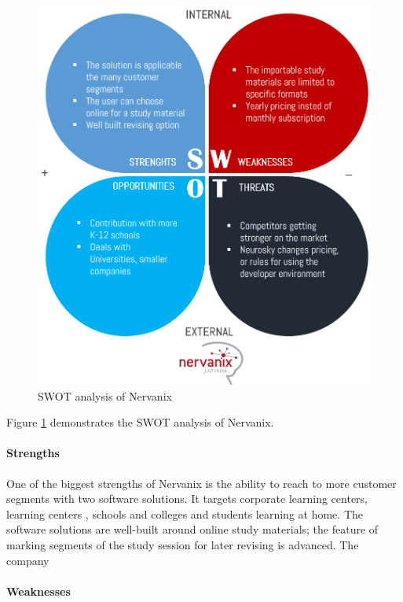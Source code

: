 \documentclass[letterpaper,10pt]{article}
\begin{document}
\begin{figure}[!htb]
\centering
\includegraphics[scale=0.4]{nervanix_swot.PNG}
\caption{SWOT analysis of Nervanix}
\label{img:nervanix_swot}
\end{figure}

Figure \ref{img:nervanix_swot} demonstrates the SWOT analysis of Nervanix.


\paragraph{Strengths}

One of the biggest strengths of Nervanix is the ability to reach to more customer segments with two software solutions. It targets corporate learning centers, learning centers , schools and colleges and students learning at home. The software solutions are well-built around online study materials; the feature of marking segments of the study session for later revising is advanced. The company  

\paragraph{Weaknesses}
\end{document}
